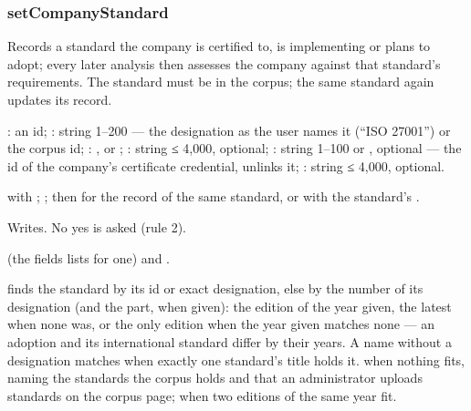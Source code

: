 \subsubsection{setCompanyStandard}\label{sec:tools:setCompanyStandard}
\begin{description}[style=multiline, leftmargin=19mm, labelwidth=17mm, labelsep=2mm,
  font=\sffamily\bfseries\footnotesize\color{ink}, itemsep=1pt, topsep=2pt, before=\raggedright]
  \item[Does] Records a standard the company is certified to, is implementing or plans to
    adopt; every later analysis then assesses the company against that standard's
    requirements. The standard must be in the corpus; the same standard again updates its
    record.
  \item[Input] : an id; : string 1--200 --- the designation as
    the user names it (\enquote{ISO 27001}) or the corpus id; : ,
     or ; : string ≤ 4,000, optional;
    : string 1--100 or , optional --- the id of the company's
    certificate credential,  unlinks it; : string ≤ 4,000, optional.
  \item[Calls]  with ;
    ; then
     for the record of the same standard, or
     with the standard's .
  \item[Kind] Writes. No yes is asked (rule 2).
  \item[Returns]  (the fields  lists for one) and
    .
  \item[Errors]  finds the standard by its id or exact designation, else by
    the number of its designation (and the part, when given): the edition of the year given,
    the latest when none was, or the only edition when the year given matches none --- an
    adoption and its international standard differ by their years. A name without a
    designation matches when exactly one standard's title holds it.
     when nothing fits, naming the standards the corpus holds and that
    an administrator uploads standards on the corpus page;  when two
    editions of the same year fit.
\end{description}

